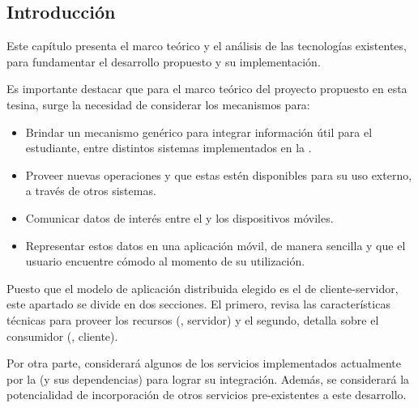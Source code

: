 \subsection{Introducción}
\label{analisis_servicios_introduccion}

Este capítulo presenta el marco teórico y el análisis de las tecnologías existentes, para fundamentar el desarrollo propuesto y su implementación.

Es importante destacar que para el marco teórico del proyecto propuesto en esta tesina, surge la necesidad de considerar los mecanismos para:
\begin{itemize}
\item Brindar un mecanismo genérico para integrar información útil para el estudiante, entre distintos sistemas implementados en la \unlp{}.
\item Proveer nuevas operaciones y que estas estén disponibles para su uso externo, a través de otros sistemas.
\item Comunicar datos de interés entre el  y los dispositivos móviles.
\item Representar estos datos en una aplicación móvil, de manera sencilla y que el usuario encuentre cómodo al momento de su utilización.
\end{itemize}

Puesto que el modelo de aplicación distribuida elegido es el de cliente-servidor, este apartado se divide en dos secciones. El primero, revisa las características técnicas para proveer los recursos (, servidor) y el segundo, detalla sobre el consumidor (, cliente).

Por otra parte, considerará algunos de los servicios implementados actualmente por la \unlp{} (y sus dependencias) para lograr su integración. Además, se considerará la potencialidad de incorporación de otros servicios pre-existentes a este desarrollo.


